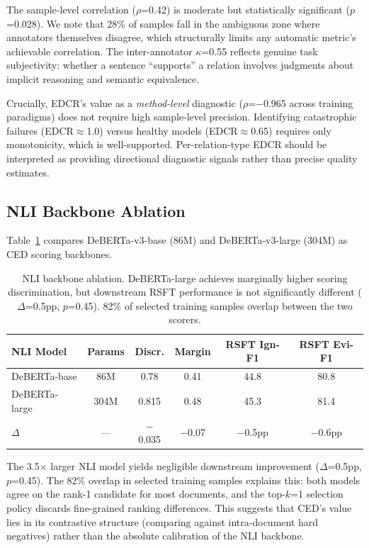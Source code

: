 \documentclass[11pt,a4paper]{article}
\newcommand{\edcr}{EDCR}
\newcommand{\ced}{CED}
\begin{document}
The sample-level correlation ($\rho$=0.42) is moderate but statistically significant ($p$=0.028).
We note that 28\% of samples fall in the ambiguous zone where annotators themselves disagree, which structurally limits any automatic metric's achievable correlation.
The inter-annotator $\kappa$=0.55 reflects genuine task subjectivity: whether a sentence ``supports'' a relation involves judgments about implicit reasoning and semantic equivalence.

Crucially, \edcr{}'s value as a \emph{method-level} diagnostic ($\rho$=$-$0.965 across training paradigms) does not require high sample-level precision.
Identifying catastrophic failures (\edcr{}$\approx$1.0) versus healthy models (\edcr{}$\approx$0.65) requires only monotonicity, which is well-supported.
Per-relation-type \edcr{} should be interpreted as providing directional diagnostic signals rather than precise quality estimates.

\subsection{NLI Backbone Ablation}
\label{sec:nli_ablation}

Table~\ref{tab:nli_ablation} compares DeBERTa-v3-base (86M) and DeBERTa-v3-large (304M) as \ced{} scoring backbones.

\begin{table}[t]
\centering
\small
\begin{tabular}{lccccc}
\toprule
\textbf{NLI Model} & \textbf{Params} & \textbf{Discr.} & \textbf{Margin} & \textbf{RSFT Ign-F1} & \textbf{RSFT Evi-F1} \\
\midrule
DeBERTa-base & 86M & 0.78 & 0.41 & 44.8 & 80.8 \\
DeBERTa-large & 304M & 0.815 & 0.48 & 45.3 & 81.4 \\
\midrule
$\Delta$ & --- & $-$0.035 & $-$0.07 & $-$0.5pp & $-$0.6pp \\
\bottomrule
\end{tabular}
\caption{NLI backbone ablation. DeBERTa-large achieves marginally higher scoring discrimination, but downstream RSFT performance is not significantly different ($\Delta$=0.5pp, $p$=0.45). 82\% of selected training samples overlap between the two scorers.}
\label{tab:nli_ablation}
\end{table}

The 3.5$\times$ larger NLI model yields negligible downstream improvement ($\Delta$=0.5pp, $p$=0.45).
The 82\% overlap in selected training samples explains this: both models agree on the rank-1 candidate for most documents, and the top-$k$=1 selection policy discards fine-grained ranking differences.
This suggests that \ced{}'s value lies in its contrastive structure (comparing against intra-document hard negatives) rather than the absolute calibration of the NLI backbone.
\end{document}
